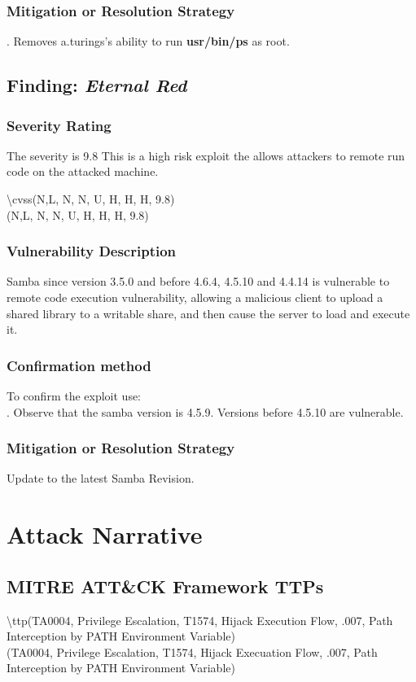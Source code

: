 \documentclass[notitlepage]{article}
\begin{document}
	\subsubsection{Mitigation or Resolution Strategy}
	\indent {}. Removes a.turings's ability to run \textbf{usr/bin/ps} as root. 
	
	\subsection{Finding: \emph{Eternal Red}}
	
	\subsubsection{Severity Rating}
	\indent The severity is 9.8 This is a high risk exploit the allows attackers to remote run code on the attacked machine. 
	
	\textbackslash cvss(N,L, N, N, U, H, H, H, 9.8)\\
	\cvss(N,L, N, N, U, H, H, H, 9.8) \\
	
	\subsubsection{Vulnerability Description}
	\indent Samba since version 3.5.0 and before 4.6.4, 4.5.10 and 4.4.14 is vulnerable to remote code execution vulnerability, allowing a malicious client to upload a shared library to a writable share, and then cause the server to load and execute it.
	
	\subsubsection{Confirmation method}
	To confirm the exploit use: \\
	. Observe that the samba version is 4.5.9. Versions before 4.5.10 are vulnerable. 
	
	\subsubsection{Mitigation or Resolution Strategy}
	\indent Update to the latest Samba Revision.  
	
	\section{Attack Narrative}

	
	\subsection{MITRE ATT{\&}CK Framework TTPs}
	
	\indent\textbackslash ttp(TA0004, Privilege Escalation, T1574, Hijack Execution Flow, .007, Path Interception by PATH Environment Variable) \\
	\ttp(TA0004, Privilege Escalation, T1574, Hijack Execuation Flow, .007, Path Interception by PATH Environment Variable) \\
	
\end{document}
